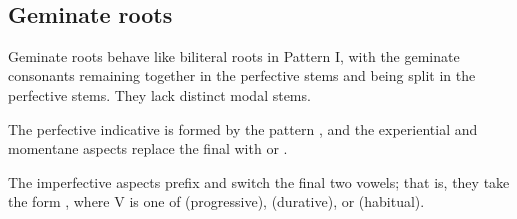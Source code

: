 \documentclass[grammar]{subfiles}
\begin{document}
\begin{table}[h!]\small\capstart
  \centering
  \\
  \caption{Pattern I biliteral stems \label{tab:vm_i_biliteral_stems}}
\end{table}


\subsection{Geminate roots}
\label{ssec:vm_i_geminate_roots}

Geminate roots behave like biliteral roots in Pattern I, with the geminate
consonants remaining together in the perfective stems and being split in the
perfective stems.  They lack distinct modal stems. 

The perfective indicative is formed by the pattern , and the
experiential and momentane aspects replace the final  with  or
.

The imperfective aspects prefix  and switch the final two vowels; that
is, they take the form , where V is one of 
(progressive),  (durative), or  (habitual).
\end{document}
